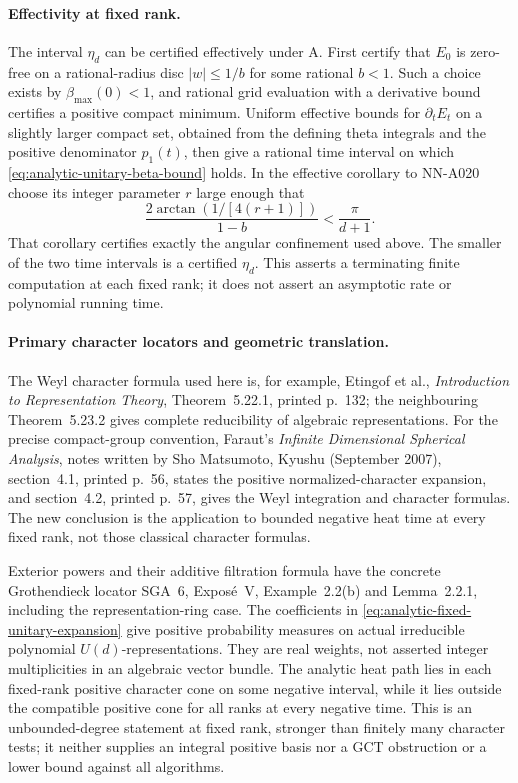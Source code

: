 \paragraph{Effectivity at fixed rank.}
The interval $\eta_d$ can be certified effectively under A.
First certify that $E_0$ is zero-free on a rational-radius disc
$|w|\le1/b$ for some rational $b<1$. Such a choice exists by
$\beta_{\max}(0)<1$, and rational grid evaluation with a
derivative bound certifies a positive compact minimum.
Uniform effective bounds for $\partial_t E_t$ on a slightly
larger compact set, obtained from the defining theta integrals
and the positive denominator $p_1(t)$, then give a rational
time interval on which \eqref{eq:analytic-unitary-beta-bound}
holds. In the effective corollary to NN-A020 choose its integer
parameter $r$ large enough that
\[
       \frac{2\arctan(1/[4(r+1)])}{1-b}
                                      <\frac{\pi}{d+1}.
\]
That corollary certifies exactly the angular confinement used
above. The smaller of the two time intervals is a certified
$\eta_d$. This asserts a terminating finite computation at
each fixed rank; it does not assert an asymptotic rate or
polynomial running time.

\paragraph{Primary character locators and geometric translation.}
The Weyl character formula used here is, for example, Etingof
et al., \emph{Introduction to Representation Theory},
Theorem~5.22.1, printed p.~132; the neighbouring
Theorem~5.23.2 gives complete reducibility of algebraic
representations. For the precise compact-group convention,
Faraut's \emph{Infinite Dimensional Spherical Analysis},
notes written by Sho Matsumoto, Kyushu (September 2007), section~4.1,
printed p.~56, states the positive normalized-character
expansion, and section~4.2, printed p.~57, gives the Weyl
integration and character formulas. The new conclusion is
the application to bounded negative heat time at every fixed
rank, not those classical character formulas.

Exterior powers and their additive filtration formula have
the concrete Grothendieck locator SGA~6, Expos\'e~V,
Example~2.2(b) and Lemma~2.2.1, including the representation-ring
case. The coefficients in
\eqref{eq:analytic-fixed-unitary-expansion} give positive
probability measures on actual irreducible polynomial
$U(d)$-representations. They are real weights, not asserted
integer multiplicities in an algebraic vector bundle.
The analytic heat path lies in each fixed-rank positive
character cone on some negative interval, while it lies
outside the compatible positive cone for all ranks at every
negative time. This is an unbounded-degree statement at
fixed rank, stronger than finitely many character tests;
it neither supplies an integral positive basis nor a GCT
obstruction or a lower bound against all algorithms.



